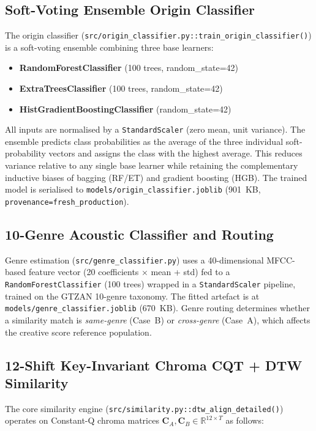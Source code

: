 \documentclass[12pt,a4paper]{article}
\begin{document}
\subsection{Soft-Voting Ensemble Origin Classifier}

The origin classifier (\texttt{src/origin\_classifier.py::train\_origin\_classifier()})
is a soft-voting ensemble combining three base learners:
\begin{itemize}[noitemsep]
  \item \textbf{RandomForestClassifier} (100 trees, random\_state=42)
  \item \textbf{ExtraTreesClassifier} (100 trees, random\_state=42)
  \item \textbf{HistGradientBoostingClassifier} (random\_state=42)
\end{itemize}
All inputs are normalised by a \texttt{StandardScaler} (zero mean, unit
variance). The ensemble predicts class probabilities as the average of the
three individual soft-probability vectors and assigns the class with the
highest average. This reduces variance relative to any single base learner
while retaining the complementary inductive biases of bagging (RF/ET) and
gradient boosting (HGB). The trained model is serialised to
\texttt{models/origin\_classifier.joblib} (901~KB, \texttt{provenance=fresh\_production}).

\subsection{10-Genre Acoustic Classifier and Routing}

Genre estimation (\texttt{src/genre\_classifier.py}) uses a 40-dimensional
MFCC-based feature vector (20 coefficients $\times$ mean + std) fed to a
\texttt{RandomForestClassifier} (100 trees) wrapped in a \texttt{StandardScaler}
pipeline, trained on the GTZAN 10-genre taxonomy. The fitted artefact is at
\texttt{models/genre\_classifier.joblib} (670~KB). Genre routing determines
whether a similarity match is \emph{same-genre} (Case~B) or \emph{cross-genre}
(Case~A), which affects the creative score reference population.

\subsection{12-Shift Key-Invariant Chroma CQT + DTW Similarity}

The core similarity engine (\texttt{src/similarity.py::dtw\_align\_detailed()})
operates on Constant-Q chroma matrices $\mathbf{C}_A, \mathbf{C}_B \in
\mathbb{R}^{12 \times T}$ as follows:
\end{document}
